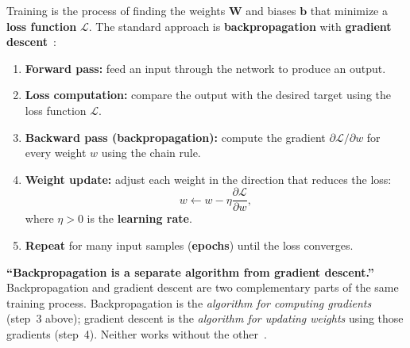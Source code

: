 Training is the process of finding the weights $\bm{W}$ and biases $\bm{b}$
that minimize a \textbf{loss function} $\mathcal{L}$.
The standard approach is \textbf{backpropagation} with
\textbf{gradient descent}~\cite{da2024survey}:

\begin{enumerate}
    \item \textbf{Forward pass:} feed an input through the network
          to produce an output.
    \item \textbf{Loss computation:} compare the output with the
          desired target using the loss function $\mathcal{L}$.
    \item \textbf{Backward pass (backpropagation):} compute the
          gradient $\partial\mathcal{L}/\partial w$ for every weight $w$
          using the chain rule.
    \item \textbf{Weight update:} adjust each weight in the direction
          that reduces the loss:
          \begin{equation}
              w \leftarrow w - \eta \frac{\partial\mathcal{L}}{\partial w},
              \label{eq:gradient_descent}
          \end{equation}
          where $\eta > 0$ is the \textbf{learning rate}.
    \item \textbf{Repeat} for many input samples (\textbf{epochs}) until
          the loss converges.
\end{enumerate}

\begin{misconception}
    \textbf{``Backpropagation is a separate algorithm from gradient descent.''} \\
    Backpropagation and gradient descent are two complementary parts of the
    same training process.  Backpropagation is the \emph{algorithm for
    computing gradients} (step~3 above); gradient descent is the
    \emph{algorithm for updating weights} using those gradients (step~4).
    Neither works without the other~\cite{da2024survey}.
\end{misconception}


